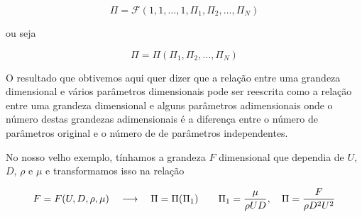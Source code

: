 \[
\Pi = \mathcal{F}\left(1, 1, \ldots, 1, \Pi_1, \Pi_2, \ldots, \Pi_N \right)
\]

ou seja

\[
\Pi = \Pi\left(\Pi_1, \Pi_2, \ldots, \Pi_N \right)
\]

O resultado que obtivemos aqui quer dizer que a relação entre uma grandeza dimensional e vários parâmetros dimensionais pode ser reescrita como a relação entre uma grandeza dimensional e alguns parâmetros adimensionais onde o número destas grandezas adimensionais é a diferença entre o número de parâmetros original e o número de de parâmetros independentes.

No nosso velho exemplo, tínhamos a grandeza $F$ dimensional que dependia de $U$, $D$, $\rho$ e $\mu$ e transformamos isso na relação

\[
F = F(U, D, \rho, \mu) \quad\longrightarrow\quad \Pi = \Pi(\Pi_1) \qquad \Pi_1 = \frac{\mu}{\rho U D}, \quad \Pi = \frac{F}{\rho D^2 U^2}
\]



